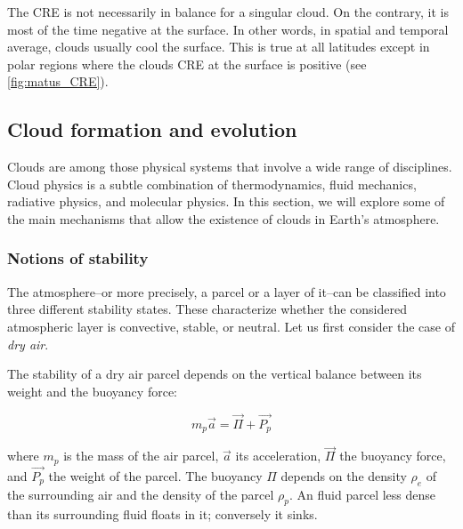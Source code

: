     The CRE is not necessarily in balance for a singular cloud. On the contrary, it is most of the time negative at the surface. In other words, in spatial and temporal average, clouds usually cool the surface. This is true at all latitudes except in polar regions where the clouds CRE at the surface is positive (see \cref{fig:matus_CRE}).



    \subsection{Cloud formation and evolution}
    \label{sec:cloud_formation}
    Clouds are among those physical systems that involve a wide range of disciplines. Cloud physics is a subtle combination of thermodynamics, fluid mechanics, radiative physics, and molecular physics.
    In this section, we will explore some of the main mechanisms that allow the existence of clouds in Earth's atmosphere.

    \subsubsection{Notions of stability}

    The atmosphere\---or more precisely, a parcel or a layer of it\---can be classified into three different stability states. These characterize whether the considered atmospheric layer is convective, stable, or neutral.
    Let us first consider the case of \textit{dry air}.
    
    The stability of a dry air parcel depends on the vertical balance between its weight and the buoyancy force:

    \begin{equation}
        m_p \vec{a} = \vec{\Pi} + \vec{P_p}
    \end{equation}

    where $ m_p $ is the mass of the air parcel, \( \vec{a} \) its acceleration, \( \vec{\Pi} \) the buoyancy force, and \( \vec{P_p} \) the weight of the parcel. 
    The buoyancy \(\Pi\) depends on the density \(\rho_e\) of the surrounding air and the density of the parcel \(\rho_p\). An fluid parcel less dense than its surrounding fluid floats in it; conversely it sinks.
    
